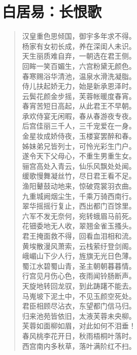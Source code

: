 \documentclass[12pt,oneside]{book}
\newenvironment{shici}{
\begin{verse}
\centering\large\hspace{12pt}}
{\end{verse}}
\begin{document}
\chapter{白居易：长恨歌}
\begin{shici}
汉皇重色思倾国，御宇多年求不得。\\
杨家有女初长成，养在深闺人未识。\\
天生丽质难自弃，一朝选在君王侧。\\
回眸一笑百媚生，六宫粉黛无颜色。\\
春寒赐浴华清池，温泉水滑洗凝脂。\\
侍儿扶起娇无力，始是新承恩泽时。\\
云鬓花颜金步摇，芙蓉帐暖度春宵。\\
春宵苦短日高起，从此君王不早朝。\\
承欢侍宴无闲暇，春从春游夜专夜。\\
后宫佳丽三千人，三千宠爱在一身。\\
金星妆成娇侍夜，玉楼宴罢醉和春。\\
姊妹弟兄皆列士，可怜光彩生门户。\\
遂令天下父母心，不重生男重生女。\\
骊宫高处入青云，仙乐风飘处处闻。\\
缓歌慢舞凝丝竹，尽日君王看不足。\\
渔阳鼙鼓动地来，惊破霓裳羽衣曲。\\
九重城阙烟尘生，千乘万骑西南行。\\
翠华摇摇行复止，西出都门百馀里。\\
六军不发无奈何，宛转蛾眉马前死。\\
花钿委地无人收，翠翘金雀玉搔头。\\
君王掩面救不得，回看血泪相和流。\\
黄埃散漫风萧索，云栈萦纡登剑阁。\\
峨嵋山下少人行，旌旗无光日色薄。\\
蜀江水碧蜀山青，圣主朝朝暮暮情。\\
行宫见月伤心色，夜雨闻铃肠断声。\\
天旋地转回龙驭，到此踌躇不能去。\\
马嵬坡下泥土中，不见玉颜空死处。\\
君臣相顾尽沾衣，东望都门信马归。\\
归来池苑皆依旧，太液芙蓉未央柳。\\
芙蓉如面柳如眉，对此如何不泪垂！\\
春风桃李花开日，秋雨梧桐叶落时。\\
西宫南内多秋草，落叶满阶红不扫。\\

\end{shici}
\end{document}
